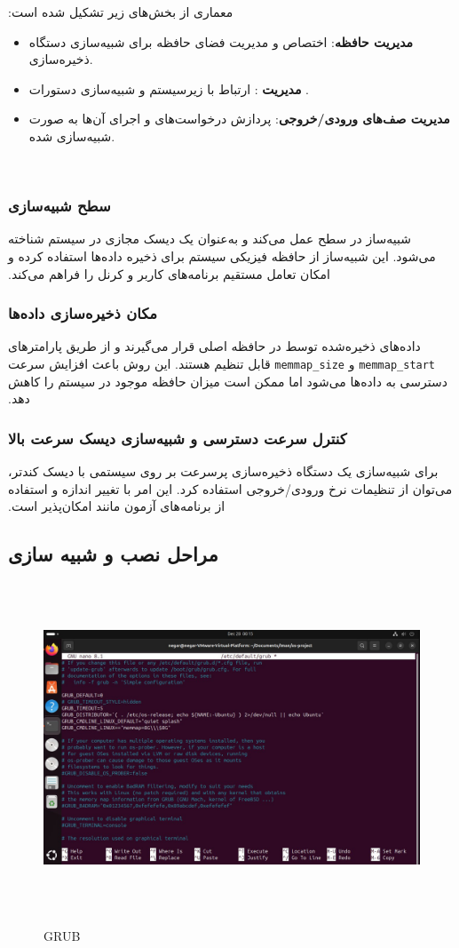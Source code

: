 ‫معماری  از بخش‌های زیر تشکیل شده است:
‫\begin{itemize}
‫	\item \textbf{مدیریت حافظه}: اختصاص و مدیریت فضای حافظه برای شبیه‌سازی دستگاه ذخیره‌سازی.
‫	\item \textbf{مدیریت }: ارتباط با زیرسیستم  و شبیه‌سازی دستورات .
‫	\item \textbf{مدیریت صف‌های ورودی/خروجی}: پردازش درخواست‌های  و اجرای آن‌ها به صورت شبیه‌سازی شده.
‫\end{itemize}
‫
‫\subsubsection*{سطح شبیه‌سازی}
‫شبیه‌ساز  در سطح  عمل می‌کند و به‌عنوان یک دیسک مجازی  در سیستم شناخته می‌شود. این شبیه‌ساز از حافظه فیزیکی سیستم برای ذخیره داده‌ها استفاده کرده و امکان تعامل مستقیم برنامه‌های کاربر و کرنل را فراهم می‌کند.
‫
‫\subsubsection*{مکان ذخیره‌سازی داده‌ها}
‫داده‌های ذخیره‌شده توسط  در حافظه اصلی قرار می‌گیرند و از طریق پارامترهای \texttt{memmap\_start} و \texttt{memmap\_size} قابل تنظیم هستند. این روش باعث افزایش سرعت دسترسی به داده‌ها می‌شود اما ممکن است میزان حافظه موجود در سیستم را کاهش دهد.
‫
‫\subsubsection*{کنترل سرعت دسترسی و شبیه‌سازی دیسک سرعت بالا}
‫برای شبیه‌سازی یک دستگاه ذخیره‌سازی پرسرعت بر روی سیستمی با دیسک کندتر، می‌توان از تنظیمات نرخ ورودی/خروجی استفاده کرد. این امر با تغییر اندازه  و استفاده از برنامه‌های آزمون مانند  امکان‌پذیر است.
‫
‫‫\subsection*{مراحل نصب و شبیه سازی}
‫
‫\begin{figure}[H]
‫	‫    \centering
‫	‫    \includegraphics[width=\textwidth]{figs/11.jpg}
‫	‫    \caption{GRUB}
‫\end{figure}
